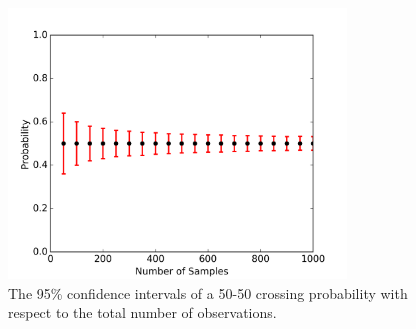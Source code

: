         \begin{figure}[!htbp]
        \begin{center}
            \includegraphics[width=0.8\textwidth]{Figures/bootRho}
            \caption{The 95\% confidence intervals of a 50-50 crossing probability with respect to the total number of observations.}
            \label{fig:bootRho}
        \end{center}
        \end{figure}
